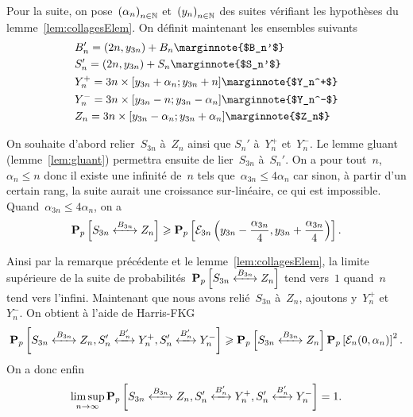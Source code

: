 	Pour la suite, on pose~$\suite{\alpha}$ et~$\suite{y}$ des suites vérifiant les hypothèses du lemme~\ref{lem:collagesElem}. On définit maintenant les ensembles suivants
	\begin{align*}
		&B_n' = (2n, y_{3n}) + B_n \marginnote{$B_n'$} \\
		&S_n' = (2n, y_{3n}) + S_n \marginnote{$S_n'$} \\
		&Y_n^+ = {3n} \times [y_{3n} + \alpha_n; y_{3n} + n] \marginnote{$Y_n^+$} \\
		&Y_n^- = {3n} \times [y_{3n} - n; y_{3n} - \alpha_n] \marginnote{$Y_n^-$} \\
		&Z_n = {3n} \times [y_{3n} - \alpha_n; y_{3n} + \alpha_n] \marginnote{$Z_n$}
	\end{align*}
	

	On souhaite d'abord relier~$S_{3n}$ à~$Z_n$ ainsi que $S_n'$ à~$Y_n^+$ et~$Y_n^-$. Le lemme gluant (lemme~\ref{lem:gluant}) permettra ensuite de lier~$S_{3n}$ à~$S_n'$. On a pour tout~$n$, $\alpha_n \leq n$ donc il existe une infinité de~$n$ tels que~$\alpha_{3n} \leq 4\alpha_n$ car sinon, à partir d'un certain rang, la suite aurait une croissance sur-linéaire, ce qui est impossible. Quand~$\alpha_{3n} \leq 4\alpha_n$, on a
	\[
		\Pp{\relie[B_{3n}]{S_{3n}}{Z_n}} \geq \Pp{\mathcal{E}_{3n}\left(y_{3n} - \frac{\alpha_{3n}}{4}, y_{3n} + \frac{\alpha_{3n}}{4}\right)}.
	\]

	Ainsi par la remarque précédente et le lemme~\ref{lem:collagesElem}, la limite supérieure de la suite de probabilités~$\Pp{\relie[B_{3n}]{S_{3n}}{Z_n}}$ tend vers~$1$ quand~$n$ tend vers l'infini. Maintenant que nous avons relié~$S_{3n}$ à~$Z_n$, ajoutons y~$Y_n^+$ et~$Y_n^-$. On obtient à l'aide de Harris-FKG
	\[
		\Pp{\relie[B_{3n}]{S_{3n}}{Z_n}, \relie[B_n']{S_n'}{Y_n^+}, \relie[B_n']{S_n'}{Y_n^-}} \geq \Pp{\relie[B_{3n}]{S_{3n}}{Z_n} }\Pp{\mathcal{E}_n(0, \alpha_n)}^2.
	\]
	On a donc enfin
	\[ 
		\limsup_{n \to \infty} \Pp{\relie[B_{3n}]{S_{3n}}{Z_n}, \relie[B_n']{S_n'}{Y_n^+}, \relie[B_n']{S_n'}{Y_n^-}} = 1.
	\]


